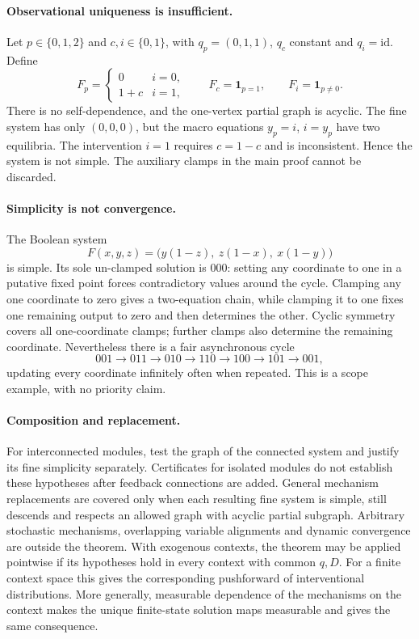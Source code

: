 \documentclass[11pt,a4paper]{article}
\theoremstyle{definition}
\theoremstyle{remark}
\newcommand{\id}{\mathrm{id}}
\begin{document}
\paragraph{Observational uniqueness is insufficient.}
Let $p\in\{0,1,2\}$ and $c,i\in\{0,1\}$, with $q_p=(0,1,1)$, $q_c$ constant and $q_i=\id$. Define
\[
 F_p=\begin{cases}0&i=0,\\1+c&i=1,\end{cases}
 \qquad F_c=\mathbf1_{p=1},\qquad F_i=\mathbf1_{p\ne0}.
\]
There is no self-dependence, and the one-vertex partial graph is acyclic. The fine system has only $(0,0,0)$, but the macro equations $y_p=i$, $i=y_p$ have two equilibria. The intervention $i=1$ requires $c=1-c$ and is inconsistent. Hence the system is not simple. The auxiliary clamps in the main proof cannot be discarded.

\paragraph{Simplicity is not convergence.}
The Boolean system
\[
 F(x,y,z)=\bigl(y(1-z),\ z(1-x),\ x(1-y)\bigr)
\]
is simple. Its sole un-clamped solution is $000$: setting any coordinate to one in a putative fixed point forces contradictory values around the cycle. Clamping any one coordinate to zero gives a two-equation chain, while clamping it to one fixes one remaining output to zero and then determines the other. Cyclic symmetry covers all one-coordinate clamps; further clamps also determine the remaining coordinate. Nevertheless there is a fair asynchronous cycle
\[
 001\to011\to010\to110\to100\to101\to001,
\]
updating every coordinate infinitely often when repeated. This is a scope example, with no priority claim.

\paragraph{Composition and replacement.}
For interconnected modules, test the graph of the connected system and justify its fine simplicity separately. Certificates for isolated modules do not establish these hypotheses after feedback connections are added. General mechanism replacements are covered only when each resulting fine system is simple, still descends and respects an allowed graph with acyclic partial subgraph. Arbitrary stochastic mechanisms, overlapping variable alignments and dynamic convergence are outside the theorem. With exogenous contexts, the theorem may be applied pointwise if its hypotheses hold in every context with common $q,D$. For a finite context space this gives the corresponding pushforward of interventional distributions. More generally, measurable dependence of the mechanisms on the context makes the unique finite-state solution maps measurable and gives the same consequence.
\end{document}
